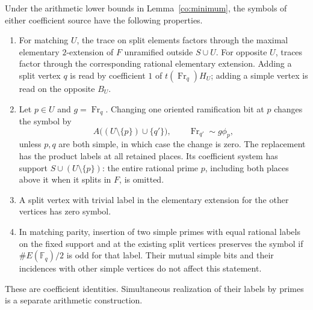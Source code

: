 \begin{proposition}\label{co:symbol-interface}
Under the arithmetic lower bounds in Lemma~\ref{co:minimum}, the
symbols of either coefficient source have the following properties.
\begin{enumerate}
\item For matching $U$, the trace on split elements factors through
the maximal elementary $2$-extension of $F$ unramified outside
$S\cup U$.  For opposite $U$, traces factor through the corresponding
rational elementary extension.  Adding a split vertex $q$ is read
by coefficient $1$ of $t(\operatorname{Fr}_q)H_U$; adding a simple
vertex is read on the opposite $B_U$.
\item Let $p\in U$ and $g=\operatorname{Fr}_q$.  Changing one
oriented ramification bit at $p$ changes the symbol by
\begin{equation}\label{co:contraction}
 A\bigl((U\setminus\{p\})\cup\{q'\}\bigr),\qquad
 \operatorname{Fr}_{q'}\sim g\phi_p,
\end{equation}
unless $p,q$ are both simple, in which case the change is zero.
The replacement has the product labels at all retained places.
Its coefficient system has support $S\cup(U\setminus\{p\})$:
the entire rational prime $p$, including both places above it when
it splits in $F$, is omitted.
\item A split vertex with trivial label in the elementary extension
for the other vertices has zero symbol.
\item In matching parity, insertion of two simple primes with equal
rational labels on the fixed support and at the existing split
vertices preserves the symbol if
$\#E(\mathbb F_q)/2$ is odd for that label.  Their mutual simple
bits and their incidences with other simple vertices do not affect
this statement.
\end{enumerate}
These are coefficient identities.  Simultaneous realization of
their labels by primes is a separate arithmetic construction.
\end{proposition}


